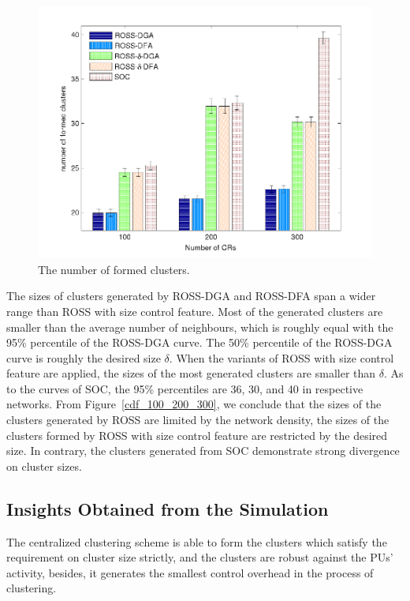 \documentclass[10pt,journal,compsoc]{IEEEtran}
\theoremstyle{mytheoremstyle}
\theoremstyle{mytheoremstyle}
\theoremstyle{mytheoremstyle}
\begin{document}
\begin{figure}[!h]
  \centering
   \includegraphics[width=0.7\linewidth]{nClusters_largeNetwork.pdf}
  \caption{The number of formed clusters.}
  \label{nClusters_largeNetwork}
\end{figure}




The sizes of clusters generated by ROSS-DGA and ROSS-DFA span a wider range than ROSS with size control feature.
Most of the generated clusters are smaller than the average number of neighbours, which is roughly equal with the 95\% percentile of the ROSS-DGA curve.
The 50\% percentile of the ROSS-DGA curve is roughly the desired size $\delta$.
When the variants of ROSS with size control feature are applied, the sizes of the most generated clusters are smaller than $\delta$.
As to the curves of SOC, the 95\% percentiles are 36, 30, and 40 in respective networks.
%
From Figure~\ref{cdf_100_200_300}, we conclude that the sizes of the clusters generated by ROSS are limited by the network density, the sizes of the clusters formed by ROSS with size control feature are restricted by the desired size.
In contrary, the clusters generated from SOC demonstrate strong divergence on cluster sizes.


\subsection{Insights Obtained from the Simulation}
The centralized clustering scheme is able to form the clusters which satisfy the requirement on cluster size strictly, and the clusters are robust against the PUs' activity, besides, it generates the smallest control overhead in the process of clustering.
\end{document}
